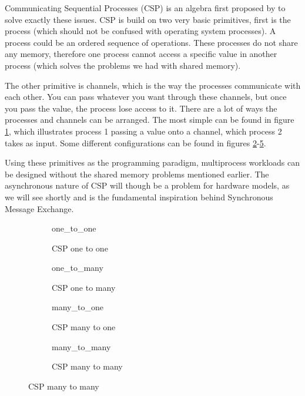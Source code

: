     Communicating Sequential Processes (CSP) is an algebra first proposed by \citet{HoareC1978Csp} to solve exactly these issues.
    CSP is build on two very basic primitives, first is the process (which should not be confused with operating system processes). A process could be an ordered sequence of operations. These processes do not share any memory, therefore one process cannot access a specific value in another process (which solves the problems we had with shared memory).
    
    The other primitive is channels, which is the way the processes communicate with each other. You can pass whatever you want through these channels, but once you pass the value, the process lose access to it. There are a lot of ways the processes and channels can be arranged. The most simple can be found in figure \ref{fig:one_to_one}, which illustrates process 1 passing a value onto a channel, which process 2 takes as input. Some different configurations can be found in figures  \ref{fig:one_to_many}-\ref{fig:many_to_many}. 
    
    Using these primitives as the programming paradigm, multiprocess workloads can be designed without the shared memory problems mentioned earlier. The asynchronous nature of CSP will though be a problem for hardware models, as we will see shortly and is the fundamental inspiration behind Synchronous Message Exchange. 

    \begin{figure}[h!]
        \hspace*{-1.25cm}
        \begin{subfigure}[t]{0.5\textwidth}
            \centering
            {one_to_one}
            \caption{CSP one to one}
            \label{fig:one_to_one}
        \end{subfigure}%
        \hspace*{1cm}
        \begin{subfigure}[t]{0.5\textwidth}
            \centering
            {one_to_many}
            \caption{CSP one to many}
            \label{fig:one_to_many}
        \end{subfigure}
        \vspace*{2cm}
        
        \hspace*{-1cm}
        \begin{subfigure}[b]{0.5\textwidth}
            \centering
            {many_to_one}
            \caption{CSP many to one}
            \label{fig:many_to_one}
        \end{subfigure}%
        \hspace*{1cm}
        \begin{subfigure}[b]{0.5\textwidth}
            \centering
            {many_to_many}
            \caption{CSP many to many}
            \label{fig:many_to_many}
        \end{subfigure}%
    \end{figure}
    
